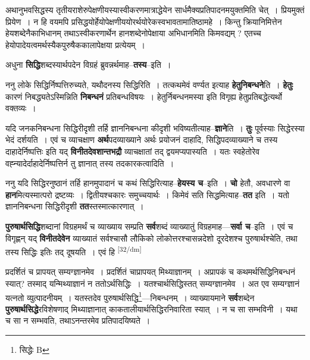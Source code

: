 \documentclass[article,12pt,a4paper]{memoir}
\begin{document}
	  \pstart अथानुभवसिद्धस्य तृतीयराशेरुपेक्षणीयस्यास्वीकरणमात्राद्धेयेन सार्धमैक्यप्रतिपादनमयुक्तमिति चेत् । प्रियमुक्तं प्रियेण । न हि वयमपि प्रसिद्धयोर्हेयोपेक्षणीययोरर्थयोरेकस्वभावतामातिष्ठामहे । किन्तु क्रियानिमित्तेन हेयशब्देनैकाभिधानम् तथाऽस्वीकरणार्थेन हानशब्देनोपेक्षाया अभिधानमिति किमवद्यम् ? एतच्च हेयोपादेयत्वमर्थस्यैकपुरुषैककालापेक्षया प्रत्येयम् ।
	\pend
      

	  \pstart अधुना \textbf{सिद्धि}शब्दस्यार्थपदेन विग्रहं ब्रुवन्नर्थमाह--\textbf{तस्य}--इति ।
	\pend
      

	  \pstart ननु लोके सिद्धिर्निष्पत्तिरुच्यते, यथौदनस्य सिद्धिरिति । तत्कथमेवं वर्ण्यत इत्याह \textbf{हेतुनिबन्धने}ति । \textbf{हेतुः} कारणं निबद्ध्यतेऽस्मिन्निति \textbf{निबन्धनं} प्रतिबन्धविषयः । हेतुर्निबन्धनमस्या इति विगृह्य हेतुप्रतिबद्धेत्यर्थो वक्तव्यः ।
	\pend
      

	  \pstart यदि जनकनिबन्धना सिद्धिरीदृशी तर्हि ज्ञाननिबन्धना कीदृशी भविष्यतीत्याह--\textbf{ज्ञाने}ति । \textbf{तुः} पूर्वस्याः सिद्धेरस्या भेदं दर्शयति । एवं च व्याचक्षाण \textbf{अर्थ}पदव्याख्याने अर्थः प्रयोजनं दाहादि, सिद्धिपदव्याख्याने च तस्य दाहादेर्निष्पत्तिः इति यद् \textbf{विनीतदेवशान्तभद्रौ} व्याचक्षातां तद् द्वयमप्यपास्यति । यतः स्वहेतोरेव वह्न्यादेर्दाहादेर्निष्पत्तिर्न तु ज्ञानात् तस्य तदकारकत्वादिति ।
	\pend
      

	  \pstart ननु यदि सिद्धिरनुष्ठानं तर्हि हानमुपादानं च कथं सिद्धिरित्याह--\textbf{हेयस्य च}--इति । \textbf{चो} हेतौ, अवधारणे वा \textbf{हान}मित्यस्मात्परो द्रष्टव्यः । द्वितीयश्चकारः समुच्चयार्थः । किमेवं सति सिद्धमित्याह--\textbf{तत} इति । यतो ज्ञाननिबन्धना सिद्धिरीदृशी \textbf{तत}स्तस्मात्कारणात् ।
	\pend
      

	  \pstart \textbf{पुरुषार्थसिद्धि}शब्दानां विग्रहमर्थं च व्याख्याय सम्प्रति \textbf{सर्व}शब्दं व्याख्यातुं विग्रहमाह—\textbf{सर्वा च}--इति । एवं च विगृह्णन् यद् \textbf{विनीतदेवेन} व्याख्यातं सर्वश्चासौ लौकिको लोकोत्तरश्चासन्नदेशो दूरदेशश्च पुरुषार्थश्चेति, तथा तस्य सिद्धिः इतिः तद् दूषयति । एवं हि  \leavevmode\textsuperscript{\rmlatinfont\tiny [32/dm]} 
	  
	प्रदर्शितं च प्रापयत् सम्यग्ज्ञानमेव । प्रदर्शितं चाप्रापयत् मिथ्याज्ञानम् । अप्रापकं च कथमर्थसिद्धिनिबन्धनं स्यात्? तस्माद् यन्मिथ्याज्ञानं न ततोऽर्थसिद्धिः । यतश्चार्थसिद्धिस्तत् सम्यग्ज्ञानमेव । अत एव सम्यग्ज्ञानं यत्नतो व्युत्पादनीयम् । यतस्तदेव पुरुषार्थसिद्धि\footnote{सिद्धेः B}—निबन्धनम् । व्याख्यायमाने \textbf{सर्व}शब्देन \textbf{पुरुषार्थसिद्धे}रविशेषणाद् मिथ्याज्ञानात् काकतालीयार्थसिद्धिरनिवारिता स्यात् । न च सा सम्भविनी । यथा च सा न सम्भवति, तथाऽनन्तरमेव प्रतिपादयिष्यते ।
	\pend
      
\end{document}
